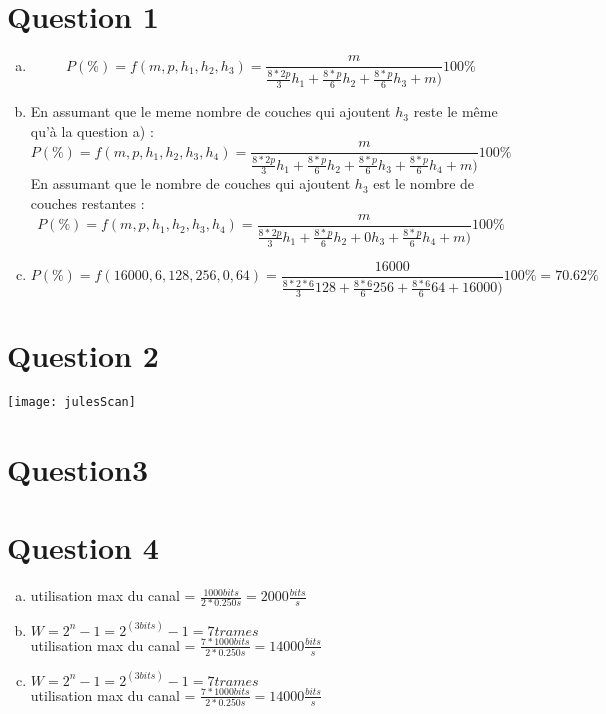 
\section{Question 1}
\begin{enumerate}[(a)]
	\item 
		\[ P(\%) = f(m, p, h_1, h_2, h_3) = 
		\frac{m}{\frac{8*2p}{3}h_1 + \frac{8*p}{6}h_2 + \frac{8*p}{6}h_3 + m)} 100\%\]
	
	\item 
		En assumant que le meme nombre de couches qui ajoutent $h_3$ reste le même qu'à la
		question a) :
		\[ P(\%) = f(m, p, h_1, h_2, h_3, h_4) = 
		\frac{m}{\frac{8*2p}{3}h_1 + \frac{8*p}{6}h_2 + \frac{8*p}{6}h_3 + \frac{8*p}{6}h_4 + m)} 100\%\]
	En assumant que le nombre de couches qui ajoutent $h_3$ est le nombre de couches restantes :  
		\[ P(\%) = f(m, p, h_1, h_2, h_3, h_4) = 
		\frac{m}{\frac{8*2p}{3}h_1 + \frac{8*p}{6}h_2 + 0h_3 + \frac{8*p}{6}h_4 + m)} 100\%\]
	\item
		\[ P(\%) = f(16000, 6, 128, 256, 0, 64) = 
		\frac{16000}{\frac{8*2*6}{3}128 + \frac{8*6}{6}256 + \frac{8*6}{6}64 + 16000)} 100\% = 70.62\%\]
\end{enumerate}


\section{Question 2}

\texttt{[image: julesScan]}

\section{Question3}


\section{Question 4}
\begin{enumerate}[(a)]
	\item 
		utilisation max du canal = $\frac{1000 bits}{2 * 0.250s} = 2000\frac{bits}{s}$
	\item
		$W = 2^n-1 = 2^(3bits)-1 = 7 trames$\\
		utilisation max du canal = $\frac{7 * 1000 bits}{2 * 0.250s} = 14000\frac{bits}{s}$
	\item
		$W = 2^n-1 = 2^(3bits)-1 = 7 trames$\\
		utilisation max du canal = $\frac{7 * 1000 bits}{2 * 0.250s} = 14000\frac{bits}{s}$
\end{enumerate}

